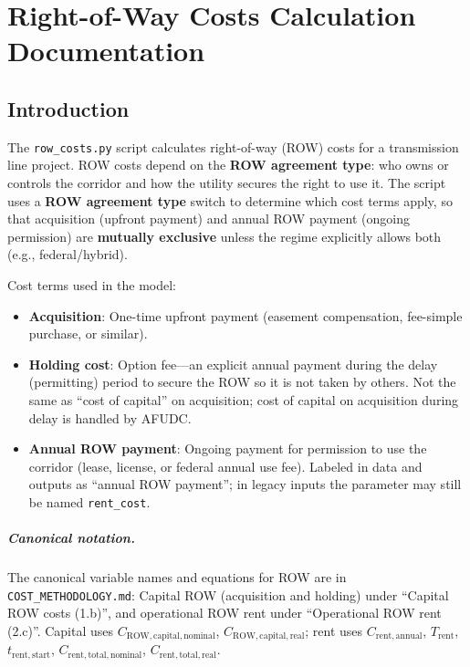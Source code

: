 \documentclass[ctcc_full_documentation.tex]{subfiles}
\begin{document}
\chapter{Right-of-Way Costs Calculation Documentation}

\section{Introduction}

The \texttt{row\_costs.py} script calculates right-of-way (ROW) costs for a transmission line project. ROW costs depend on the \textbf{ROW agreement type}: who owns or controls the corridor and how the utility secures the right to use it. The script uses a \textbf{ROW agreement type} switch to determine which cost terms apply, so that acquisition (upfront payment) and annual ROW payment (ongoing permission) are \textbf{mutually exclusive} unless the regime explicitly allows both (e.g., federal/hybrid).

Cost terms used in the model:
\begin{itemize}
    \item \textbf{Acquisition}: One-time upfront payment (easement compensation, fee-simple purchase, or similar).
    \item \textbf{Holding cost}: Option fee---an explicit annual payment during the delay (permitting) period to secure the ROW so it is not taken by others. Not the same as ``cost of capital'' on acquisition; cost of capital on acquisition during delay is handled by AFUDC.
    \item \textbf{Annual ROW payment}: Ongoing payment for permission to use the corridor (lease, license, or federal annual use fee). Labeled in data and outputs as ``annual ROW payment''; in legacy inputs the parameter may still be named \texttt{rent\_cost}.
\end{itemize}

\paragraph{Canonical notation.}
The canonical variable names and equations for ROW are in \texttt{COST\_METHODOLOGY.md}: Capital ROW (acquisition and holding) under ``Capital ROW costs (1.b)'', and operational ROW rent under ``Operational ROW rent (2.c)''. Capital uses $C_{\mathrm{ROW,capital,nominal}}$, $C_{\mathrm{ROW,capital,real}}$; rent uses $C_{\mathrm{rent,annual}}$, $T_{\mathrm{rent}}$, $t_{\mathrm{rent,start}}$, $C_{\mathrm{rent,total,nominal}}$, $C_{\mathrm{rent,total,real}}$.
\end{document}
